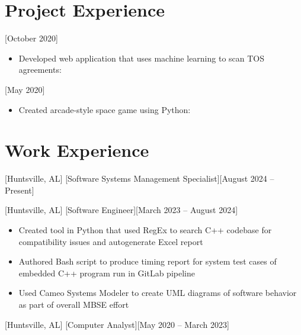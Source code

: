 \documentclass[hidelinks, 11pt]{article}
\begin{document}
\section{Project Experience}

[October 2020]

\begin{itemize}
	\item Developed web application that uses machine learning to scan TOS agreements: 
\end{itemize}

[May 2020]

\begin{itemize}
	\item Created arcade-style space game using Python: 
\end{itemize}

\section{Work Experience}

[Huntsville, AL]
[Software Systems Management Specialist][August 2024 -- Present]

\medbreak

[Huntsville, AL]
[Software Engineer][March 2023 -- August 2024]

\begin{itemize}
	\item Created tool in Python that used RegEx to search C++ codebase for compatibility issues and autogenerate Excel report
	\item Authored Bash script to produce timing report for system test cases of embedded C++ program run in GitLab pipeline
	\item Used Cameo Systems Modeler to create UML diagrams of software behavior as part of overall MBSE effort
\end{itemize}

[Huntsville, AL]
[Computer Analyst][May 2020 -- March 2023]
\end{document}
